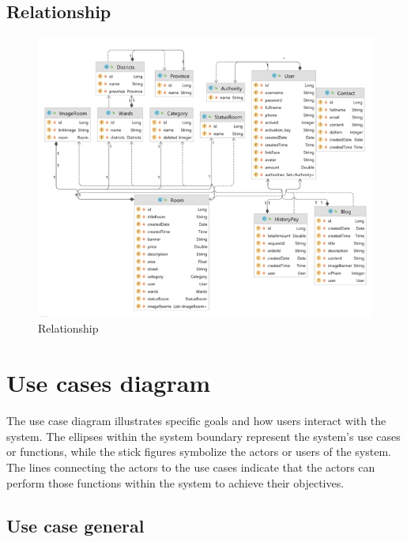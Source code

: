 \documentclass[../Main.tex]{subfiles}
\begin{document}
\subsection{Relationship}

\begin{figure}[H]
    \centering
    \includegraphics[width=\textwidth]{Figure/Picture7.png}
    \caption{Relationship}
    \label{fig:relationship}
\end{figure}

\section{Use cases diagram}

The use case diagram illustrates specific goals and how users interact with the system.
The ellipses within the system boundary represent the system's use cases or functions, while the stick figures symbolize the actors or users of the system.
The lines connecting the actors to the use cases indicate that the actors can perform those functions within the system to achieve their objectives.

\subsection{Use case general}
\end{document}
